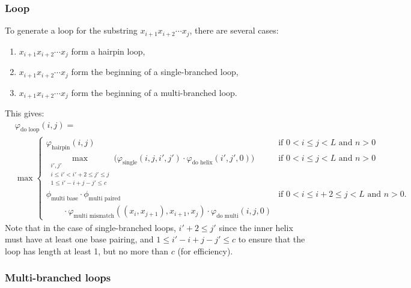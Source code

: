 \documentclass{article}
\newcommand{\vhairpin}{\varphi_\text{hairpin}}
\newcommand{\multimismatch}{\varphi_\text{multi mismatch}}
\newcommand{\doloop}{\varphi_\text{do loop}}
\newcommand{\single}{\varphi_\text{single}}
\newcommand{\domulti}{\varphi_\text{do multi}}
\newcommand{\multibase}{\phi_\text{multi base}}
\newcommand{\multipaired}{\phi_\text{multi paired}}
\newcommand{\dohelix}{\varphi_\text{do helix}}
\begin{document}
  \subsubsection{Loop}

  To generate a loop for the substring $x_{i+1} x_{i+2} \cdots x_j$, there are several cases:
  \begin{enumerate}
  \item $x_{i+1} x_{i+2} \cdots x_j$ form a hairpin loop,
  \item $x_{i+1} x_{i+2} \cdots x_j$ form the beginning of a single-branched loop,
  \item $x_{i+1} x_{i+2} \cdots x_j$ form the beginning of a multi-branched loop.
  \end{enumerate}
  This gives:
  \begin{align*}
    &\doloop(i,j) = \\
    &\max \begin{cases}
      \vhairpin(i,j) & \text{if $0<i\le j<L$ and $n>0$} \\
      \displaystyle \max_{\substack{i', j' \\ i \le i' < i'+2 \le j' \le j \\ 1 \le i'-i + j-j' \le c}}
      \bigl(\single(i,j,i',j') \cdot \dohelix(i',j',0)\bigr) & \text{if $0<i\le j<L$ and $n>0$} \\
      \multibase \cdot \multipaired & \text{if $0<i\le i+2 \le j<L$ and $n>0$.} \\
      \qquad{} \cdot \multimismatch((x_i,x_{j+1}),x_{i+1},x_j) \cdot \domulti(i,j,0)
    \end{cases}
  \end{align*}
  Note that in the case of single-branched
  loops, $i'+2 \le j'$ since the inner helix must have at least one base pairing, and $1 \le i'-i+j-j' \le c$ to
  ensure that the loop has length at least 1, but no more than $c$ (for efficiency).

  \subsubsection{Multi-branched loops}
  
\end{document}
